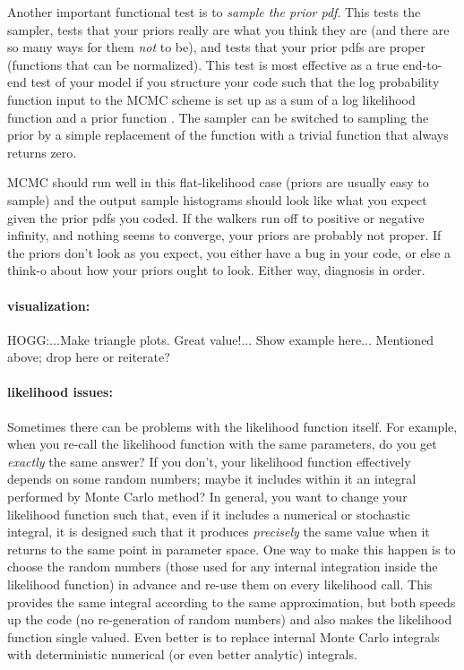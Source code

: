 \documentclass[12pt,twoside,pdftex]{article}
\begin{document}
Another important functional test is to \emph{sample the prior pdf}.
This tests the sampler,
  tests that your priors really are what you think they are
  (and there are so many ways for them \emph{not} to be),
  and tests that your prior pdfs are proper
  (functions that can be normalized).
This test is most effective as a true end-to-end test of your model
  if you structure your code such that the log probability function 
  input to the MCMC scheme
  is set up as a sum of a log likelihood function 
  and a prior function .
The sampler can be switched to sampling the prior by a simple replacement
  of the  function
  with a trivial function that always returns zero.

MCMC should run well in this flat-likelihood case (priors are usually easy to sample)
  and the output sample histograms should look like what you expect
  given the prior pdfs you coded.
If the walkers run off to positive or negative infinity,
  and nothing seems to converge,
  your priors are probably not proper.
If the priors don't look as you expect,
  you either have a bug in your code,
  or else a think-o about how your priors ought to look.
Either way, diagnosis in order.

\paragraph{visualization:}
HOGG:...Make triangle plots.  Great value!...  Show example here... Mentioned above; drop here or reiterate?

\paragraph{likelihood issues:}
Sometimes there can be problems with the likelihood function itself.
For example,
  when you re-call the likelihood function with the same parameters,
  do you get \emph{exactly} the same answer?
If you don't, your likelihood function effectively depends on some random numbers;
  maybe it includes within it an integral performed by Monte Carlo method?
In general, you want to change your likelihood function such that,
  even if it includes a numerical or stochastic integral,
  it is designed such that it produces \emph{precisely} the same
  value when it returns to the same point in parameter space.
One way to make this happen is to choose the random numbers
  (those used for any internal integration inside the likelihood function)
  in advance and re-use them on every likelihood call.
This provides the same integral according to the same approximation,
  but both speeds up the code (no re-generation of random numbers)
  and also makes the likelihood function single valued.
Even better is to replace internal Monte Carlo integrals with
  deterministic numerical (or even better analytic) integrals.
\end{document}
